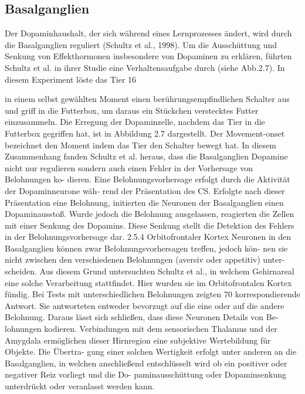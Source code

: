 \subsection{ Basalganglien}
Der Dopaminhaushalt, der sich während eines Lernprozesses ändert, wird durch die
Basalganglien reguliert (Schultz et al., 1998). Um die Ausschüttung und Senkung von
Effekthormonen insbesondere von Dopaminen zu erklären, führten Schultz et al. in ihrer
Studie eine Verhaltensaufgabe durch (siehe Abb.2.7). In diesem Experiment löste das Tier
16

in einem selbst gewählten Moment einen berührungsempfindlichen Schalter aus und griff
in die Futterbox, um daraus ein Stückchen verstecktes Futter einzusammeln. Die Erregung
der Dopaminzelle, nachdem das Tier in die Futterbox gegriffen hat, ist in Abbildung 2.7
dargestellt. Der Movement-onset bezeichnet den Moment indem das Tier den Schalter
bewegt hat.
In diesem Zusammenhang fanden Schultz et al. heraus, dass die Basalganglien Dopamine
nicht nur regulieren sondern auch einen Fehler in der Vorhersage von Belohnungen ko-
dieren. Eine Belohnungsvorhersage erfolgt durch die Aktivität der Dopaminneurone wäh-
rend der Präsentation des CS. Erfolgte nach dieser Präsentation eine Belohnung, initierten
die Neuronen der Basalganglien einen Dopaminausstoß. Wurde jedoch die Belohnung
ausgelassen, reagierten die Zellen mit einer Senkung des Dopamins. Diese Senkung stellt
die Detektion des Fehlers in der Belohnungsvorhersage dar.
2.5.4 Orbitofrontaler Kortex
Neuronen in den Basalganglien können zwar Belohnungsvorhersagen treffen, jedoch kön-
nen sie nicht zwischen den verschiedenen Belohnungen (aversiv oder appetitiv) unter-
scheiden. Aus diesem Grund untersuchten Schultz et al., in welchem Gehirnareal eine
solche Verarbeitung stattfindet. Hier wurden sie im Orbitofrontalen Kortex fündig. Bei
Tests mit unterschiedlichen Belohnungen zeigten 70%
korrespondierende Antwort. Sie antworteten entweder bevorzugt auf die eine oder auf
die andere Belohnung. Daraus lässt sich schließen, dass diese Neuronen Details von Be-
lohnungen kodieren. Verbindungen mit dem sensorischen Thalamus und der Amygdala
ermöglichen dieser Hirnregion eine subjektive Wertebildung für Objekte. Die Übertra-
gung einer solchen Wertigkeit erfolgt unter anderen an die Basalganglien, in welchen
anschließend entschlüsselt wird ob ein positiver oder negativer Reiz vorliegt und die Do-
paminausschüttung oder Dopaminsenkung unterdrückt oder veranlasst werden kann.
